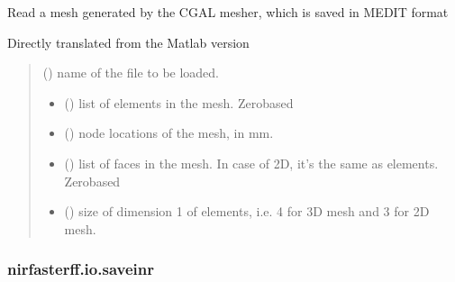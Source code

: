 \documentclass[letterpaper,10pt,english]{sphinxmanual}
\begin{document}
\begin{fulllineitems}
\label{\detokenize{_autosummary/nirfasterff.io.readMEDIT:nirfasterff.io.readMEDIT}}
\pysigstartsignatures
{}
\pysigstopsignatures
\sphinxAtStartPar
Read a mesh generated by the CGAL mesher, which is saved in MEDIT format

\sphinxAtStartPar
Directly translated from the Matlab version
\begin{quote}\begin{description}
\sphinxAtStartPar
{} () \textendash{} name of the file to be loaded.

\sphinxAtStartPar
\begin{itemize}
\item {} 
\sphinxAtStartPar
{} () \textendash{} list of elements in the mesh. Zero\sphinxhyphen{}based

\item {} 
\sphinxAtStartPar
{} () \textendash{} node locations of the mesh, in mm.

\item {} 
\sphinxAtStartPar
{} () \textendash{} list of faces in the mesh. In case of 2D, it’s the same as elements. Zero\sphinxhyphen{}based

\item {} 
\sphinxAtStartPar
{} () \textendash{} size of dimension 1 of elements, i.e. 4 for 3D mesh and 3 for 2D mesh.

\end{itemize}


\end{description}\end{quote}

\end{fulllineitems}


\sphinxstepscope


\subsubsection{nirfasterff.io.saveinr}
\label{\detokenize{_autosummary/nirfasterff.io.saveinr:nirfasterff-io-saveinr}}\label{\detokenize{_autosummary/nirfasterff.io.saveinr::doc}}
\end{document}
